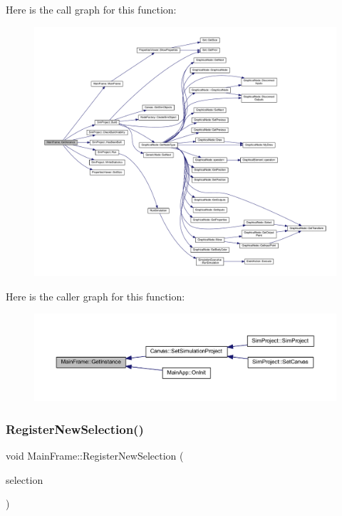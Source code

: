 Here is the call graph for this function\+:
\nopagebreak
\begin{figure}[H]
\begin{center}
\leavevmode
\includegraphics[width=350pt]{class_main_frame_a17926c75eb083f5b8249696c4cdccf55_cgraph}
\end{center}
\end{figure}
Here is the caller graph for this function\+:
\nopagebreak
\begin{figure}[H]
\begin{center}
\leavevmode
\includegraphics[width=350pt]{class_main_frame_a17926c75eb083f5b8249696c4cdccf55_icgraph}
\end{center}
\end{figure}
\mbox{\label{class_main_frame_af5c0679e1a94303e8bd0a0742c25a59b}} 
\subsubsection{\texorpdfstring{Register\+New\+Selection()}{RegisterNewSelection()}}
{\footnotesize\ttfamily void Main\+Frame\+::\+Register\+New\+Selection (\begin{DoxyParamCaption}\item[{\hyperlink{class_graphical_node}{Graphical\+Node} $\ast$}]{selection }\end{DoxyParamCaption})}



